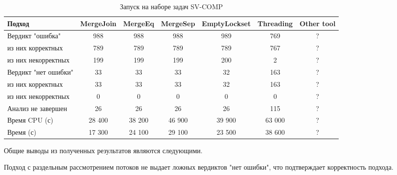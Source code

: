 

\begin{center}
  \begin{table}[h]\footnotesize
  	\label{table-sv-comp}
    \caption{Запуск на наборе задач SV-COMP}
    \begin{tabular}{ | l | c | c | c | c | c | c |}
      \hline
      Подход         & MergeJoin   & MergeEq & MergeSep & EmptyLockset & Threading & Other tool \\ \hline
      Вердикт "ошибка" & 988    & 988        & 988      & 989       & 769       & ?\\ 
  \hspace{0.5cm} из них корректных & 789 & 789 & 789      & 789       & 767       & ?\\ 
  \hspace{0.5cm} из них некорректных & 199 & 199 & 199    & 200       & 2         & ? \\ \hline
      Вердикт "нет ошибки"  & 33      & 33        & 33       & 32        & 163       & ? \\ 
  \hspace{0.5cm} из них корректных & 33 & 33    & 33       & 32        & 163       & ? \\
  \hspace{0.5cm} из них некорректных & 0 & 0    & 0        & 0         & 0         & ? \\ \hline
      Анализ не завершен       & 26     & 26         & 26       & 26        & 115       & ? \\ \hline
      Время CPU (с)   & 28 400 & 38 200     & 46 900  & 39 900    & 63 000    & ? \\ 
      Время (с)  & 17 300 & 24 100     & 29 100   & 23 500    & 38 600    & ? \\
      \hline
    \end{tabular}
  \end{table}
\end{center}

Общие выводы из полученных результатов являются следующими.

Подход с раздельным рассмотрением потоков не выдает ложных вердиктов "нет ошибки", что подтверждает корректность подхода.

